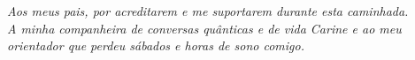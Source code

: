 \documentclass[
	12pt,				%
	openright,			%
	oneside,			%
	a4paper,			%
	english,			%
	french,				%
	spanish,			%
	brazil				%
	]{abntex2}
\begin{document}
\begin{comment}

\cleardoublepage
\begin{folhadeaprovacao}




  \begin{center}
  
  \bfseries\large\MakeUppercase{Declaração do Autor}
  \end{center} 
  
  Declaro, para fins de pesquisa acadêmica, didática e técnico-científica, que o presente Trabalho de Conclusão de Curso pode ser parcial ou totalmente utilizado desde que se faça referência à fonte e aos autores.

    \vspace{10 cm}
   
   \assinatura{\textbf{\imprimirautor} }    
      
   \begin{center}    
    {\imprimirlocal}, X de Julho de {\imprimirdata}
    \vspace*{1cm}
  \end{center}

\end{folhadeaprovacao}
\end{comment} 

\cleardoublepage
\begin{dedicatoria}
   \vspace*{\fill}
   \centering
   \noindent
   \textit{ Aos meus pais, por acreditarem e me suportarem durante esta caminhada. }  \\
   \textit{ A minha companheira de conversas quânticas e de vida Carine e ao meu orientador que perdeu sábados e horas de sono comigo.  } \vspace*{\fill}
\end{dedicatoria}

\end{document}
